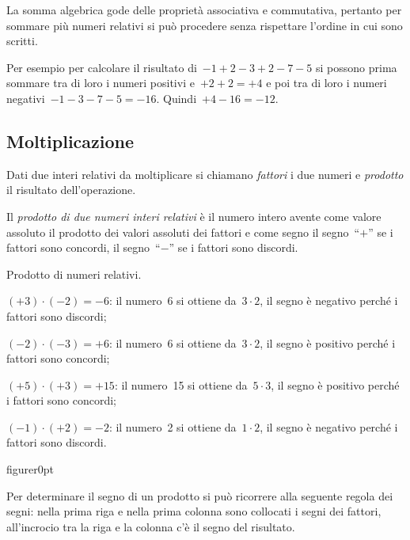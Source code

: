 La somma algebrica gode delle proprietà associativa e commutativa, pertanto per sommare più numeri relativi
si può procedere senza rispettare l'ordine in cui sono scritti.

Per esempio per calcolare
il risultato di~$-1+2-3+2-7-5$ si possono prima sommare tra di loro i numeri positivi e~$+2+2=+4$
e poi tra di loro i numeri negativi~$-1-3-7-5=-16$. Quindi~$+4-16=-12$.

\vspazio\ovalbox{\risolvii \ref{ese:2.14}, \ref{ese:2.15}}

\subsection{Moltiplicazione}

Dati due interi relativi da moltiplicare si chiamano \emph{fattori} i due numeri e \emph{prodotto} il
risultato dell'operazione.

Il \emph{prodotto di due numeri interi relativi} è il numero intero avente come valore assoluto il prodotto
dei valori assoluti dei fattori e come segno il segno~``$+$'' se i fattori sono concordi,
il segno~``$-$'' se i fattori sono discordi.

\begin{exrig}
 \begin{esempio} Prodotto di numeri relativi.
  \begin{itemize*}
  \item $(+3)\cdot(-2)=-6$: il numero~6 si ottiene da~$3\cdot2$, il segno è negativo perché i fattori sono discordi;
  \item $(-2)\cdot(-3)=+6$: il numero~6 si ottiene da~$3\cdot2$, il segno è positivo perché i fattori sono concordi;
  \item $(+5)\cdot(+3)=+15$: il numero~15 si ottiene da~$5\cdot3$, il segno è positivo perché i fattori sono concordi;
  \item $(-1)\cdot(+2)=-2$: il numero~2 si ottiene da~$1\cdot2$, il segno è negativo perché i fattori sono discordi.
  \end{itemize*}
 \end{esempio}
\end{exrig}

\begin{wrapfloat}{figure}{r}{0pt}

\end{wrapfloat}
Per determinare il segno di un prodotto si può ricorrere alla seguente regola dei segni: nella prima riga e
nella prima colonna sono collocati i segni dei fattori, all'incrocio tra la riga e la colonna c'è il segno
del risultato.

